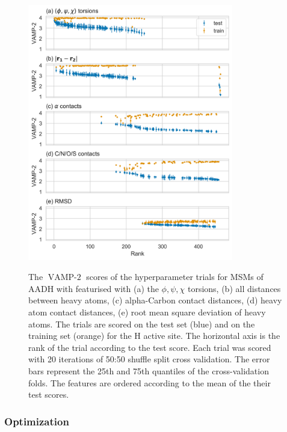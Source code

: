 \begin{figure}
    \centering
    \caption{The $\operatorname{VAMP-2}$ scores of the hyperparameter trials for MSMs of AADH with featurised with (a) the $\phi, \psi, \chi$ torsions, (b) all distances between heavy atoms, (c) alpha-Carbon contact distances, (d) heavy atom contact distances, (e) root mean square deviation of heavy atoms. The trials are scored on the test set (blue) and on the training set (orange) for the H active site. The horizontal axis is the rank of the trial according to the test score. Each trial was scored with 20 iterations of 50:50 shuffle split cross validation. The error bars represent the 25th and 75th quantiles of the cross-validation folds. The features are ordered according to the mean of the their test scores.}
    \includegraphics[width=0.8\textwidth]{chapters/msm_optimization/figures/aadh_train_test_results.png}
    \label{fig:aad_train_test}
\end{figure}




\subsubsection{Optimization}


